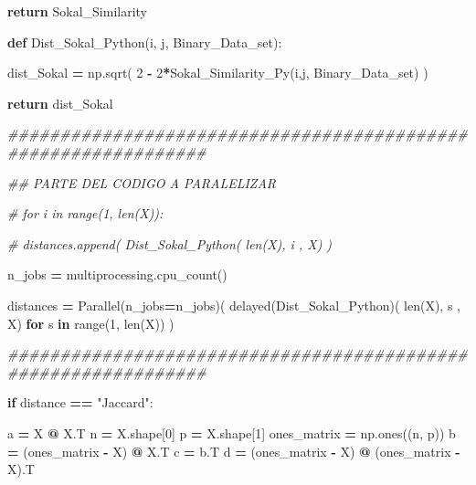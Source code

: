\documentclass[
  11pt,
  a4paper,
]{article}
\newenvironment{Shaded}{\begin{snugshade}}{\end{snugshade}}
\newcommand{\BuiltInTok}[1]{#1}
\newcommand{\CommentTok}[1]{\textcolor[rgb]{0.56,0.35,0.01}{\textit{#1}}}
\newcommand{\ControlFlowTok}[1]{\textcolor[rgb]{0.13,0.29,0.53}{\textbf{#1}}}
\newcommand{\DecValTok}[1]{\textcolor[rgb]{0.00,0.00,0.81}{#1}}
\newcommand{\KeywordTok}[1]{\textcolor[rgb]{0.13,0.29,0.53}{\textbf{#1}}}
\newcommand{\NormalTok}[1]{#1}
\newcommand{\OperatorTok}[1]{\textcolor[rgb]{0.81,0.36,0.00}{\textbf{#1}}}
\newcommand{\StringTok}[1]{\textcolor[rgb]{0.31,0.60,0.02}{#1}}
\begin{document}
\begin{Shaded}
\begin{Highlighting}[]
            \ControlFlowTok{return}\NormalTok{ Sokal\_Similarity}


        \KeywordTok{def}\NormalTok{ Dist\_Sokal\_Python(i, j, Binary\_Data\_set):}

\NormalTok{            dist\_Sokal }\OperatorTok{=}\NormalTok{ np.sqrt( }\DecValTok{2} \OperatorTok{{-}} \DecValTok{2}\OperatorTok{*}\NormalTok{Sokal\_Similarity\_Py(i,j, Binary\_Data\_set) )}

            \ControlFlowTok{return}\NormalTok{ dist\_Sokal}

\CommentTok{\#\#\#\#\#\#\#\#\#\#\#\#\#\#\#\#\#\#\#\#\#\#\#\#\#\#\#\#\#\#\#\#\#\#\#\#\#\#\#\#\#\#\#\#\#\#\#\#\#\#\#\#\#\#\#\#\#\#\#\#\#\#\#}

    \CommentTok{\#\# PARTE DEL CODIGO A PARALELIZAR}

      \CommentTok{\#  for i in range(1, len(X)):}

        \CommentTok{\#    distances.append( Dist\_Sokal\_Python( len(X), i , X) )}

\NormalTok{        n\_jobs  }\OperatorTok{=}\NormalTok{ multiprocessing.cpu\_count()}

\NormalTok{        distances }\OperatorTok{=}\NormalTok{ Parallel(n\_jobs}\OperatorTok{=}\NormalTok{n\_jobs)( delayed(Dist\_Sokal\_Python)( }\BuiltInTok{len}\NormalTok{(X), s , X) }\ControlFlowTok{for}\NormalTok{ s }\KeywordTok{in} \BuiltInTok{range}\NormalTok{(}\DecValTok{1}\NormalTok{, }\BuiltInTok{len}\NormalTok{(X)) )}

\CommentTok{\#\#\#\#\#\#\#\#\#\#\#\#\#\#\#\#\#\#\#\#\#\#\#\#\#\#\#\#\#\#\#\#\#\#\#\#\#\#\#\#\#\#\#\#\#\#\#\#\#\#\#\#\#\#\#\#\#\#\#\#\#\#\#}
   
    \ControlFlowTok{if}\NormalTok{ distance }\OperatorTok{==} \StringTok{"Jaccard"}\NormalTok{:}


\NormalTok{        a }\OperatorTok{=}\NormalTok{ X }\OperatorTok{@}\NormalTok{ X.T}
\NormalTok{        n }\OperatorTok{=}\NormalTok{ X.shape[}\DecValTok{0}\NormalTok{]}
\NormalTok{        p }\OperatorTok{=}\NormalTok{ X.shape[}\DecValTok{1}\NormalTok{]}
\NormalTok{        ones\_matrix }\OperatorTok{=}\NormalTok{ np.ones((n, p))}
\NormalTok{        b }\OperatorTok{=}\NormalTok{ (ones\_matrix }\OperatorTok{{-}}\NormalTok{ X) }\OperatorTok{@}\NormalTok{ X.T}
\NormalTok{        c }\OperatorTok{=}\NormalTok{ b.T}
\NormalTok{        d }\OperatorTok{=}\NormalTok{ (ones\_matrix }\OperatorTok{{-}}\NormalTok{ X) }\OperatorTok{@}\NormalTok{ (ones\_matrix }\OperatorTok{{-}}\NormalTok{ X).T}



\end{Highlighting}
\end{Shaded}
\end{document}
